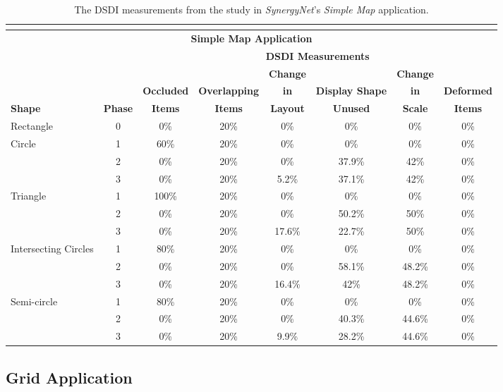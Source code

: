 \documentclass[twocolumn,compsoc]{cvm}
\newcommand{\smallline}{\arrayrulecolor{lightgray} \cline{2-8} \arrayrulecolor{black}}
\begin{document}
{\begin{table}
	\begin{tabular}{ | l | c | c | c | c | c | c | c | }	
	\multicolumn{8}{c}{ } \\
	\hline
	\multicolumn{8}{|c|}{\textbf{Simple Map Application}} \\
	\hline
	& & \multicolumn{6}{c|}{\textbf{\ac{DSDI} Measurements}} \\
	\cline{3-8}
		& & & & \textbf{Change} & & \textbf{Change} & \\
		& & \textbf{Occluded} & \textbf{Overlapping} & \textbf{in} & \textbf{Display Shape} & \textbf{in} & \textbf{Deformed} \\
		\textbf{Shape} & \textbf{Phase} & \textbf{Items} & \textbf{Items} & \textbf{Layout} & \textbf{Unused} & \textbf{Scale} & \textbf{Items} \\ 
	\hline
		Rectangle & 0 & 0\% & 20\% & 0\% & 0\% & 0\% & 0\% \\  
	\hline
		\multirow{3}{*}{Circle} & 1 & 60\% & 20\% & 0\% & 0\% & 0\% & 0\% \\ \smallline
		& 2 & 0\% & 20\% & 0\% & 37.9\% & 42\% & 0\% \\ \smallline
		& 3 & 0\% & 20\% & 5.2\% & 37.1\% & 42\% & 0\% \\
	\hline
		\multirow{3}{*}{Triangle} & 1 & 100\% & 20\% & 0\% & 0\% & 0\% & 0\% \\ \smallline
		& 2 & 0\% & 20\% & 0\% & 50.2\% & 50\% & 0\% \\ \smallline
		& 3 & 0\% & 20\% & 17.6\% & 22.7\% & 50\% & 0\% \\
	\hline
		\multirow{3}{*}{Intersecting Circles} & 1 & 80\% & 20\% & 0\% & 0\% & 0\% & 0\% \\ \smallline
		& 2 & 0\% & 20\% & 0\% & 58.1\% & 48.2\% & 0\% \\ \smallline
		& 3 & 0\% & 20\% & 16.4\% & 42\% & 48.2\% & 0\% \\
	\hline
		\multirow{3}{*}{Semi-circle} & 1 & 80\% & 20\% & 0\% & 0\% & 0\% & 0\% \\ \smallline
		& 2 & 0\% & 20\% & 0\% & 40.3\% & 44.6\% & 0\% \\ \smallline
		& 3 & 0\% & 20\% & 9.9\% & 28.2\% & 44.6\% & 0\% \\ 
	\hline
	\end{tabular}
	\caption{The \ac{DSDI} measurements from the study in {\emph{SynergyNet}}'s {\emph{Simple Map}} application.}
	\label{tab:mapApp}
\end{table}

\subsection{Grid Application}
\label{subsec:gridresults} 

}
\end{document}
